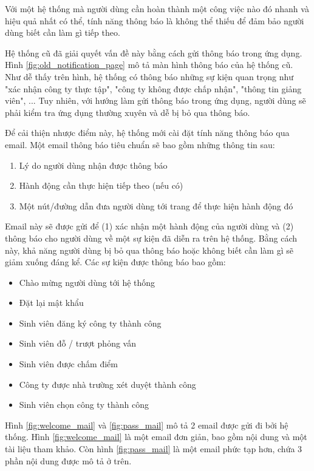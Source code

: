 \documentclass[./../main.tex]{subfiles}
\begin{document}
Với một hệ thống mà người dùng cần hoàn thành một công việc nào đó nhanh và hiệu quả nhất có thể, tính năng thông báo là không thể thiếu để đảm bảo người dùng biết cần làm gì tiếp theo.

Hệ thống cũ đã giải quyết vấn đề này bằng cách gửi thông báo trong ứng dụng. Hình \ref{fig:old_notification_page} mô tả màn hình thông báo của hệ thống cũ. Như dễ thấy trên hình, hệ thống có thông báo những sự kiện quan trọng như "xác nhận công ty thực tập", "công ty không được chấp nhận", "thông tin giảng viên", ... Tuy nhiên, với hướng làm gửi thông báo trong ứng dụng, người dùng sẽ phải kiểm tra ứng dụng thường xuyên và dễ bị bỏ qua thông báo.

Để cải thiện nhược điểm này, hệ thống mới cài đặt tính năng thông báo qua email. Một email thông báo tiêu chuẩn sẽ bao gồm những thông tin sau:

\begin{enumerate}
	\item Lý do người dùng nhận được thông báo
	\item Hành động cần thực hiện tiếp theo (nếu có)
	\item Một nút/đường dẫn đưa người dùng tới trang để thực hiện hành động đó
\end{enumerate}

Email này sẽ được gửi để (1) xác nhận một hành động của người dùng và (2) thông báo cho người dùng về một sự kiện đã diễn ra trên hệ thống. Bằng cách này, khả năng người dùng bị bỏ qua thông báo hoặc không biết cần làm gì sẽ giảm xuống đáng kể. Các sự kiện được thông báo bao gồm:

\begin{itemize}
	\item
	      Chào mừng người dùng tới hệ thống
	\item
	      Đặt lại mật khẩu
	\item
	      Sinh viên đăng ký công ty thành công
	\item
	      Sinh viên đỗ / trượt phỏng vấn
	\item
	      Sinh viên được chấm điểm
	\item
	      Công ty được nhà trường xét duyệt thành công
	\item
	      Sinh viên chọn công ty thành công
\end{itemize}

Hình \ref{fig:welcome_mail} và \ref{fig:pass_mail} mô tả 2 email được gửi đi bởi hệ thống. Hình \ref{fig:welcome_mail} là một email đơn giản, bao gồm nội dung và một tài liệu tham khảo. Còn hình \ref{fig:pass_mail} là một email phức tạp hơn, chứa 3 phần nội dung được mô tả ở trên.
\end{document}
